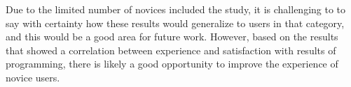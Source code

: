 Due to the limited number of novices included the study, it is challenging to to say with certainty how these results would generalize to users in that category, and this would be a good area for future work. However, based on the results that showed a correlation between experience and satisfaction with results of programming, there is likely a good opportunity to improve the experience of novice users.



